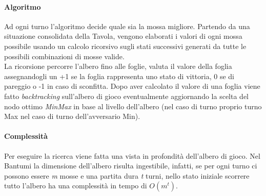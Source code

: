 \documentclass[paper=a4, fontsize=11pt]{scrartcl}	%
\numberwithin{equation}{section}															%
\numberwithin{figure}{section}																%
\numberwithin{table}{section}																%
\begin{document}
\paragraph{Algoritmo}
Ad ogni turno l'algoritmo decide quale sia la mossa migliore. Partendo da una situazione consolidata della Tavola, vengono elaborati i valori di ogni mossa possibile usando un calcolo ricorsivo sugli stati successivi generati da tutte le possibili combinazioni di mosse valide.\\
La ricorsione percorre l'albero fino alle foglie, valuta il valore della foglia assegnandogli un +1 se la foglia rappresenta uno stato di vittoria, 0 se di pareggio o -1 in caso di sconfitta. 
Dopo aver calcolato il valore di una foglia viene fatto \textit{ backtracking} sull'albero di gioco eventualmente aggiornando la scelta del nodo ottimo \textit{ MinMax} in base al livello dell'albero (nel caso di turno proprio turno Max nel caso di turno dell'avversario Min).

\paragraph{Complessit\`a}
Per eseguire la ricerca viene fatta una vista in profondit\`a dell'albero di gioco. Nel Bantumi la dimensione dell'albero risulta ingestibile, infatti, se per ogni turno ci possono essere \textit{ m} mosse e una partita dura \textit{ t} turni, nello stato iniziale scorrere tutto l'albero ha una complessit\`a in tempo di $O(m^t)$.
\end{document}
